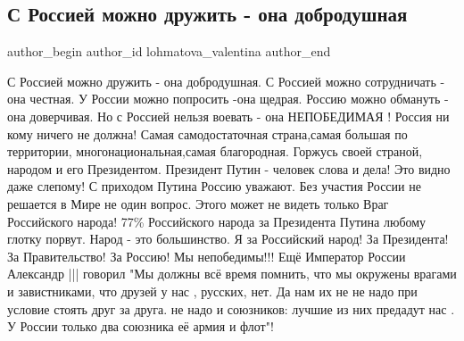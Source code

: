  
 
 
 
 
 
\subsection{С Россией можно дружить - она добродушная}
\label{sec:07_09_2021.fb.lohmatova_valentina.1.rossia_vojna_dobrodushie}
 
\ifcmt
 author_begin
   author_id lohmatova_valentina
 author_end
\fi


С Россией можно дружить - она добродушная. С Россией можно сотрудничать - она
честная. У России можно попросить -она щедрая. Россию можно обмануть - она
доверчивая.  Но с Россией нельзя воевать - она НЕПОБЕДИМАЯ ! Россия ни кому
ничего не должна! Самая самодостаточная страна,самая большая по территории,
многонациональная,самая благородная. Горжусь своей страной, народом и его
Президентом.  Президент Путин - человек слова и дела! Это видно даже слепому!
С приходом Путина  Россию уважают. Без участия России не решается в Мире не
один вопрос. Этого может не видеть только Враг Российского народа!  77\%
Российского народа за Президента Путина любому глотку порвут. Народ - это
большинство. Я за Российский народ! За Президента! За Правительство! За Россию!
Мы непобедимы!!! Ещё Император России Александр ||| говорил "Мы должны всё
время помнить, что мы окружены врагами и завистниками, что друзей у нас ,
русских, нет. Да нам  их не не надо при условие стоять друг за друга. не надо и
союзников: лучшие из них предадут нас . У России только два союзника её армия и
флот"!



